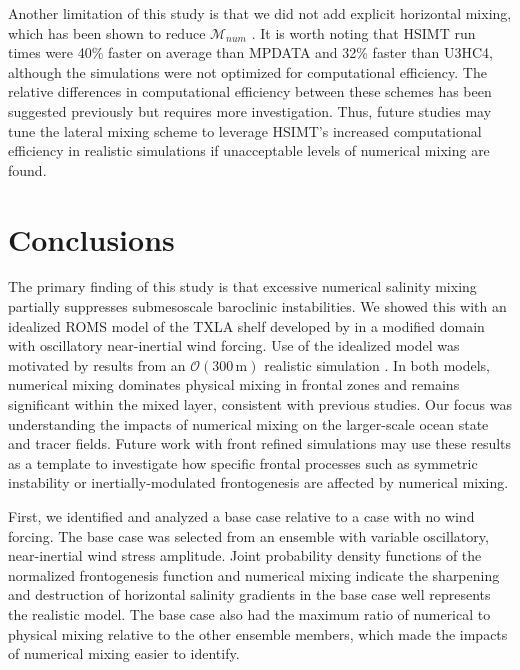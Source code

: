 Another limitation of this study is that we did not add explicit horizontal mixing, which has been shown to reduce $\mathcal{M}_{num}$ \citep{Griffies_2000,Holmes_2021,Ilicak_2012}. It is worth noting that HSIMT run times were 40\% faster on average than MPDATA and 32\% faster than U3HC4, although the simulations were not optimized for computational efficiency. The relative differences in computational efficiency between these schemes has been suggested previously \citep{wu2010advection, wu2023evaluation} but requires more investigation. Thus, future studies may tune the lateral mixing scheme to leverage HSIMT's increased computational efficiency in realistic simulations if unacceptable levels of numerical mixing are found. 

\section{Conclusions} \label{sec:conclusions}

The primary finding of this study is that excessive numerical salinity mixing partially suppresses submesoscale baroclinic instabilities. We showed this with an idealized ROMS model of the TXLA shelf developed by \citet{Hetland_2017} in a modified domain with oscillatory near-inertial wind forcing. Use of the idealized model was motivated by results from an $\mathcal{O}(300 \, \text{m})$ realistic simulation \citep{Schlichting23}. In both models, numerical mixing dominates physical mixing in frontal zones and remains significant within the mixed layer, consistent with previous studies. Our focus was understanding the impacts of numerical mixing on the larger-scale ocean state and tracer fields. Future work with front refined simulations may use these results as a template to investigate how specific frontal processes such as symmetric instability or inertially-modulated frontogenesis are affected by numerical mixing.  

First, we identified and analyzed a base case relative to a case with no wind forcing. The base case was selected from an ensemble with variable oscillatory, near-inertial wind stress amplitude. Joint probability density functions of the normalized frontogenesis function and numerical mixing indicate the sharpening and destruction of horizontal salinity gradients in the base case well represents the realistic model. The base case also had the maximum ratio of numerical to physical mixing relative to the other ensemble members, which made the impacts of numerical mixing easier to identify. 


